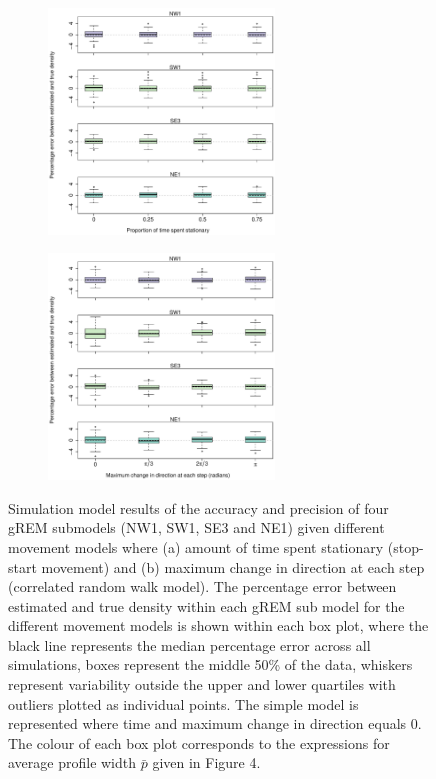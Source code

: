 \documentclass[a4paper,10pt,reqno,oneside]{amsart}
\begin{document}
\begin{figure}[t]
	\centering
	\begin{subfigure}[t]{60mm}
      		\centering
		\includegraphics[width=60mm]{imgs/ResultsPerch.pdf}
		\caption{} 
         	 \label{f:Perch}
	\end{subfigure}
	
	\begin{subfigure}[t]{60mm}
                \centering
		\includegraphics[width=60mm]{imgs/ResultsTort.pdf}
                \caption{} 
                \label{f:Tort}
         \end{subfigure}
	\label{f:BreakAssump}
	\caption{
	Simulation model results of the accuracy and precision of four gREM submodels (NW1, SW1, SE3 and NE1) given different movement models where (a) amount of time spent stationary (stop-start movement) and (b) maximum change in direction at each step (correlated random walk model). The percentage error between estimated and true density within each gREM sub model for the different movement models is shown within each box plot, where the black line represents the median percentage error across all simulations, boxes represent the middle 50\% of the data, whiskers represent variability outside the upper and lower quartiles with outliers plotted as individual points. The simple model is represented where time and maximum change in direction equals 0. The colour of each box plot corresponds to the expressions for average profile width $\bar{p}$ given in Figure 4.} 
\end{figure}
\end{document}
